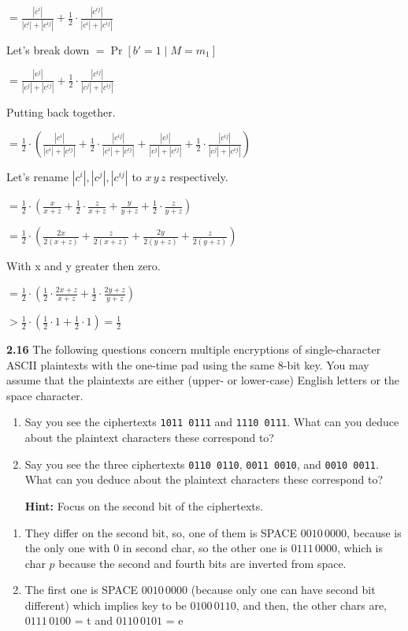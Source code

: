 $= \frac{|c^{i}|}{|c^{i}|+|c^{ij}|}  + \frac{1}{2} \cdot  \frac{|c^{ij}|}{|c^{i}|+|c^{ij}|}$

Let's break down $=\Pr[b' = 1 \mid M = m_1]$

$= \frac{|c^{j}|}{|c^{j}|+|c^{ij}|}  + \frac{1}{2} \cdot  \frac{|c^{ij}|}{|c^{j}|+|c^{ij}|}$

Putting back together.

$=\frac{1}{2} \cdot ( \frac{|c^{i}|}{|c^{i}|+|c^{ij}|} + \frac{1}{2} \cdot  \frac{|c^{ij}|}{|c^{i}|+|c^{ij}|} +  \frac{|c^{j}|}{|c^{j}|+|c^{ij}|}  + \frac{1}{2} \cdot  \frac{|c^{ij}|}{|c^{j}|+|c^{ij}|})$

Let's rename $|c^{i}|, |c^{j}|, |c^{ij}|$ to $x\, y\, z$ respectively.

$=\frac{1}{2} \cdot ( \frac{x}{x + z} + \frac{1}{2} \cdot  \frac{z}{x + z} +  \frac{y}{y+z}  + \frac{1}{2} \cdot  \frac{z}{y+z})$

$=\frac{1}{2} \cdot ( \frac{2x}{2(x + z)} + \frac{z}{2(x + z)} +  \frac{2y}{2(y+z)}  + \frac{z}{2(y+z)})$

With x and y greater then zero. 

$=\frac{1}{2} \cdot ( \frac{1}{2} \cdot \frac{2x + z}{x + z} + \frac{1}{2} \cdot \frac{2y + z}{y+z})$

$> \frac{1}{2} \cdot ( \frac{1}{2} \cdot 1 + \frac{1}{2} \cdot 1 ) = \frac{1}{2}$


\newpage
\noindent
\textbf{2.16} \hspace{1em} The following questions concern multiple encryptions of single-character ASCII plaintexts with the one-time pad using the same 8-bit key. You may assume that the plaintexts are either (upper- or lower-case) English letters or the space character.
\vspace{1em}

\begin{enumerate}
	\item[(a)] Say you see the ciphertexts \texttt{1011 0111} and \texttt{1110 0111}. What can you deduce about the plaintext characters these correspond to?
	
	\item[(b)] Say you see the three ciphertexts \texttt{0110 0110}, \texttt{0011 0010}, and \texttt{0010 0011}. What can you deduce about the plaintext characters these correspond to?
	
	\textbf{Hint:} Focus on the second bit of the ciphertexts.
\end{enumerate}

\begin{enumerate}
	\item[(a)] They differ on the second bit, so, one of them is SPACE $0010\,0000$, because is the only one with $0$ in second char, so the other one is $0111\,0000$, which is char $p$ because the second and fourth bits are inverted from space.
	
	\item[(b)] The first one is SPACE $0010\,0000$ (because only one can have second bit different) which implies key to be $0100\,0110$, and then, the other chars are, $0111\,0100$ = t and $0110\,0101$ = e
	
\end{enumerate}


